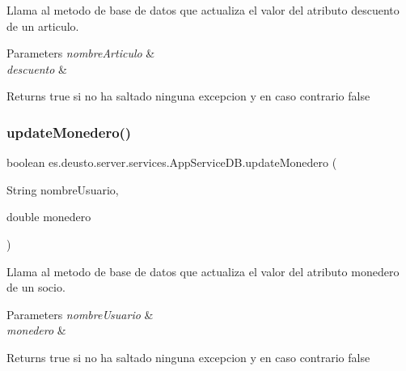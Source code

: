 Llama al metodo de base de datos que actualiza el valor del atributo descuento de un articulo. 
\begin{DoxyParams}{Parameters}
{\em nombre\+Articulo} & \\
\hline
{\em descuento} & \\
\hline
\end{DoxyParams}
\begin{DoxyReturn}{Returns}
true si no ha saltado ninguna excepcion y en caso contrario false 
\end{DoxyReturn}
\mbox{\label{classes_1_1deusto_1_1server_1_1services_1_1_app_service_d_b_acc1227082742b137a82096bca5b6945c}} 
\subsubsection{\texorpdfstring{updateMonedero()}{updateMonedero()}}
{\footnotesize\ttfamily boolean es.\+deusto.\+server.\+services.\+App\+Service\+D\+B.\+update\+Monedero (\begin{DoxyParamCaption}\item[{String}]{nombre\+Usuario,  }\item[{double}]{monedero }\end{DoxyParamCaption})}

Llama al metodo de base de datos que actualiza el valor del atributo monedero de un socio. 
\begin{DoxyParams}{Parameters}
{\em nombre\+Usuario} & \\
\hline
{\em monedero} & \\
\hline
\end{DoxyParams}
\begin{DoxyReturn}{Returns}
true si no ha saltado ninguna excepcion y en caso contrario false 
\end{DoxyReturn}
\mbox{\label{classes_1_1deusto_1_1server_1_1services_1_1_app_service_d_b_aa379ab9cb99ad97983c8c9e02204b129}} 
